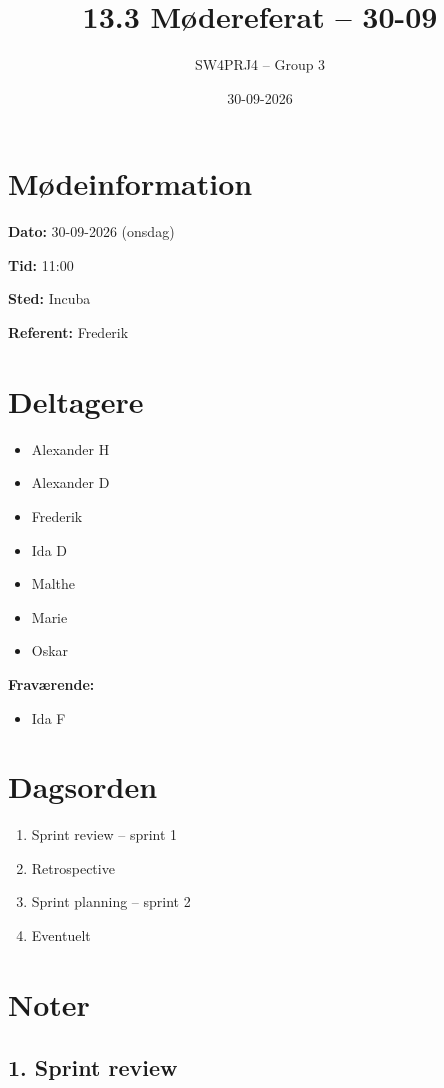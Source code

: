 \documentclass[a4paper,11pt]{article}
\title{13.3 Mødereferat -- 30-09}
\author{SW4PRJ4 -- Group 3}
\date{30-09-2026}
\begin{document}
\maketitle

\section*{Mødeinformation}

\textbf{Dato:} 30-09-2026 (onsdag)

\textbf{Tid:} 11:00

\textbf{Sted:} Incuba

\textbf{Referent:} Frederik

\section*{Deltagere}

\begin{itemize}
    \item Alexander H
    \item Alexander D
    \item Frederik
    \item Ida D
    \item Malthe
    \item Marie
    \item Oskar
\end{itemize}

\textbf{Fraværende:}

\begin{itemize}
    \item Ida F
\end{itemize}

\section*{Dagsorden}

\begin{enumerate}
    \item Sprint review -- sprint 1
    \item Retrospective
    \item Sprint planning -- sprint 2
    \item Eventuelt
\end{enumerate}

\section*{Noter}
\subsection*{1. Sprint review}
\end{document}
